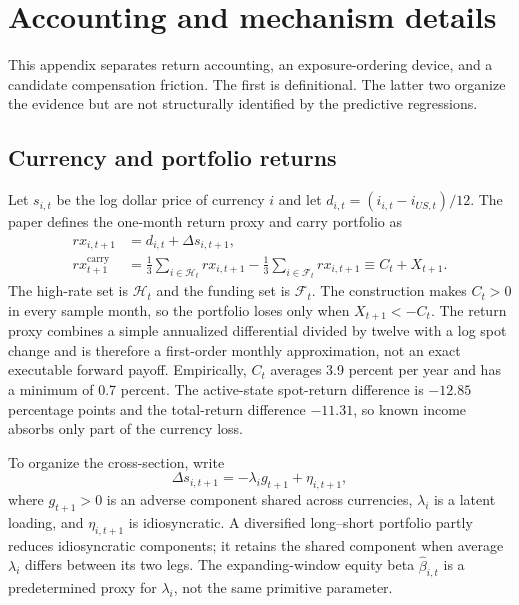 \section{Accounting and mechanism details}
\label{app:theory}

This appendix separates return accounting, an exposure-ordering device, and a candidate compensation friction. The first is definitional. The latter two organize the evidence but are not structurally identified by the predictive regressions.

\subsection{Currency and portfolio returns}

Let $s_{i,t}$ be the log dollar price of currency $i$ and let $d_{i,t}=(i_{i,t}-i_{US,t})/12$. The paper defines the one-month return proxy and carry portfolio as
\begin{equation}
\begin{aligned}
rx_{i,t+1}&=d_{i,t}+\Delta s_{i,t+1},\\
rx^{\mathrm{carry}}_{t+1}
&=\frac{1}{3}\sum_{i\in\mathcal H_t}rx_{i,t+1}
-\frac{1}{3}\sum_{i\in\mathcal F_t}rx_{i,t+1}
\equiv C_t+X_{t+1}.
\end{aligned}
\label{eq:app-accounting}
\end{equation}
The high-rate set is $\mathcal H_t$ and the funding set is $\mathcal F_t$. The construction makes $C_t>0$ in every sample month, so the portfolio loses only when $X_{t+1}<-C_t$. The return proxy combines a simple annualized differential divided by twelve with a log spot change and is therefore a first-order monthly approximation, not an exact executable forward payoff. Empirically, $C_t$ averages 3.9 percent per year and has a minimum of 0.7 percent. The active-state spot-return difference is $-12.85$ percentage points and the total-return difference $-11.31$, so known income absorbs only part of the currency loss.

To organize the cross-section, write
\begin{equation}
\Delta s_{i,t+1}=-\lambda_i g_{t+1}+\eta_{i,t+1},
\label{eq:app-exposure}
\end{equation}
where $g_{t+1}>0$ is an adverse component shared across currencies, $\lambda_i$ is a latent loading, and $\eta_{i,t+1}$ is idiosyncratic. A diversified long--short portfolio partly reduces idiosyncratic components; it retains the shared component when average $\lambda_i$ differs between its two legs. The expanding-window equity beta $\widehat\beta_{i,t}$ is a predetermined proxy for $\lambda_i$, not the same primitive parameter.

